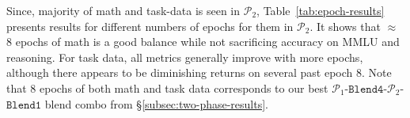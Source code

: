 \documentclass[11pt]{article}
\newcommand{\todo}[1]{{\color{red}\bf [TODO: #1]}\xspace}
\newcommand{\phaseone}{$\mathcal{P}_1$\xspace}
\newcommand{\phasetwo}{$\mathcal{P}_2$\xspace}
\newcommand{\ponebfourptwobone}{\phaseone-$\mathtt{Blend4}$-\phasetwo-$\mathtt{Blend1}$\xspace}
\begin{document}
\begin{table}[t]%
\begin{center}
\end{center}
\caption[]{Results of varying the number of epochs of math and task data during \phasetwo of training.%
\label{tab:epoch-results}}
\end{table}


Since, majority of math and task-data is seen in \phasetwo, Table~\ref{tab:epoch-results} presents results for different numbers of epochs for them in \phasetwo. 
It shows that $\approx$ 8 epochs of math is a good balance while not sacrificing accuracy on MMLU and reasoning. 
For task data, all metrics generally improve with more epochs, although there appears to be diminishing returns on several past epoch 8. 
Note that 8 epochs of both math and task data corresponds to our best \ponebfourptwobone blend combo from \S\ref{subsec:two-phase-results}.
\end{document}
